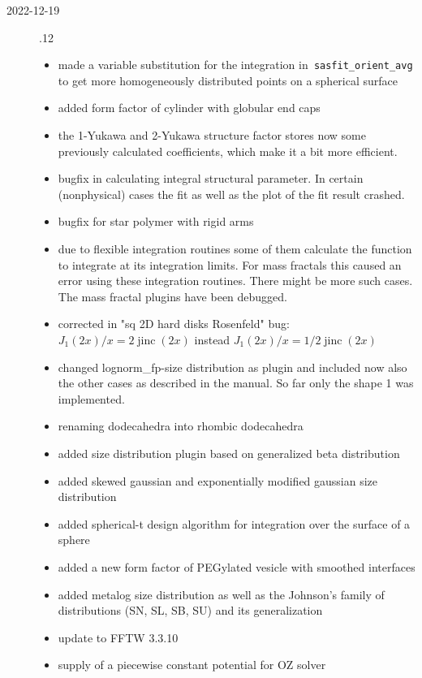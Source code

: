 \begin{description}
\item[2022-12-19] .12
    \begin{itemize}
    \item made a variable substitution for the integration in\texttt{ sasfit\_orient\_avg} to get more homogeneously distributed points on a spherical surface
    \item added form factor of cylinder with globular end caps
    \item the 1-Yukawa and 2-Yukawa structure factor stores now some previously calculated coefficients, which make it a bit more efficient.
    \item bugfix in calculating integral structural parameter.
          In certain (nonphysical) cases the fit as well as the plot of the fit result crashed.
    \item bugfix for star polymer with rigid arms
    \item  due to flexible integration routines some of them calculate the function to integrate at its integration limits. For mass fractals this caused an error using these integration routines. There might be more such cases. The mass fractal plugins have been debugged.
    \item  corrected in "sq 2D hard disks Rosenfeld" bug: $J_1(2x)/x = 2\operatorname{jinc}(2x)$ instead $J_1(2x)/x = 1/2 \operatorname{jinc}(2x)$
    \item changed lognorm\_fp-size distribution as plugin and included now also the other cases as described in the manual. So far only the shape 1 was implemented.
    \item renaming dodecahedra into rhombic dodecahedra
    \item added size distribution plugin based on generalized beta distribution
    \item added skewed gaussian and exponentially modified gaussian size distribution
    \item added spherical-t design algorithm for integration over the surface of a sphere
    \item added a new form factor of PEGylated vesicle with smoothed interfaces
    \item added metalog size distribution as well as the Johnson's family of distributions (SN, SL, SB, SU) and its generalization
    \item update to FFTW 3.3.10
    \item supply of a piecewise constant potential for OZ solver

\end{itemize}
\end{description}
